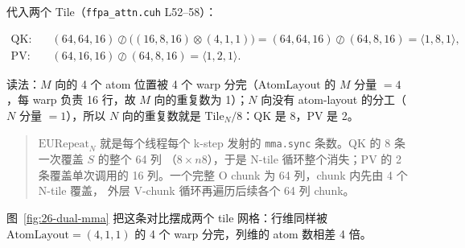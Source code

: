 代入两个 Tile（\texttt{ffpa\_\allowbreak{}attn.\allowbreak{}cuh} L52--58）：

\begin{align}
  \text{QK:}\quad & (64,64,16) \oslash \bigl((16,8,16)\otimes(4,1,1)\bigr)
    = (64,64,16)\oslash(64,8,16) = \langle 1,8,1\rangle ,
  \label{eq:26-qk}\\[2pt]
  \text{PV:}\quad & (64,16,16) \oslash (64,8,16) = \langle 1,2,1\rangle .
  \label{eq:26-pv}
\end{align}

读法：$M$ 向的 4 个 atom 位置被 4 个 warp 分完（$\mathrm{AtomLayout}$ 的
$M$ 分量 $=4$，每 warp 负责 16 行，故 $M$ 向的重复数为 1）；$N$ 向没有
atom-layout 的分工（$N$ 分量 $=1$），所以 $N$ 向的重复数就是
$\mathrm{Tile}_N/8$：QK 是 8，PV 是 2。

\begin{quote}
  $\mathrm{EURepeat}_N$ 就是每个线程每个 k-step 发射的
  \texttt{mma.sync} 条数。\allowbreak{}QK 的 8 条一次覆盖 $S$ 的整个 64 列
  （$8\times n8$），于是 N-tile 循环整个消失；PV 的 2 条覆盖单次调用的
  16 列。一个完整 O chunk 为 64 列，chunk 内先由 4 个 N-tile 覆盖，
  外层 V-chunk 循环再遍历后续各个 64 列 chunk。
\end{quote}

图~\ref{fig:26-dual-mma} 把这条对比摆成两个 tile 网格：行维同样被
$\mathrm{AtomLayout}=(4,1,1)$ 的 4 个 warp 分完，列维的 atom 数相差 4 倍。

